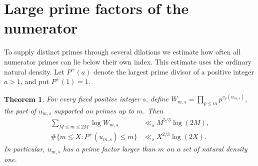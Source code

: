 \documentclass[11pt,a4paper,oneside,openany]{report}
\newtheorem{theorem}{Theorem}[section]
\theoremstyle{remark}\newtheorem{remark}[theorem]{Remark}
\numberwithin{equation}{section}
\newcommand{\card}{\#}\newcommand{\vol}{\operatorname{meas}}
\begin{document}
\section{Large prime factors of the numerator}\label{ch8:sec:num}
To supply distinct primes through several dilations we estimate how often all numerator primes can lie below their own index. This estimate uses the ordinary natural density. Let $P^+(a)$ denote the largest prime divisor of a positive integer $a>1$, and put $P^+(1)=1$.
\begin{theorem}\label{ch8:thm:num}
For every fixed positive integer $s$, define
$W_{m,s}=\prod_{p\le m}p^{v_p(u_{m,s})}$, the part of $u_{m,s}$ supported on primes up to $m$. Then
\begin{align}
 \sum_{M\le m\le 2M}\log W_{m,s}&\ll_s M^{5/3}\log(2M),\label{ch8:eq:mass}\\
 \card\{m\le X:P^+(u_{m,s})\le m\}&\ll_s X^{2/3}\log(2X).\label{ch8:eq:exc}
\end{align}
In particular, $u_{m,s}$ has a prime factor larger than $m$ on a set of natural density one.
\end{theorem}
\end{document}
